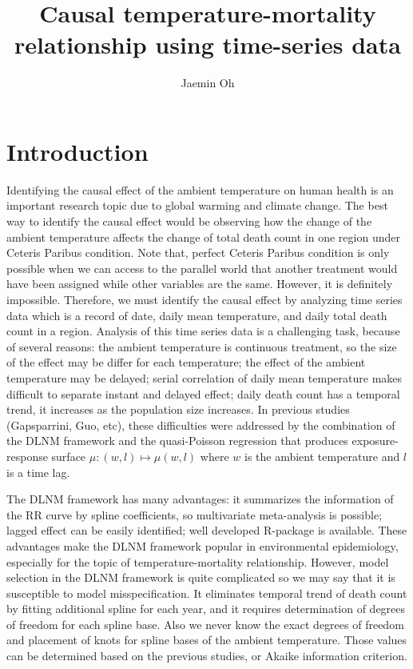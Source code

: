 \documentclass[12pt]{article}
\author[1]{Jaemin Oh}
\affil[1]{Department of Mathematical Sciences, KAIST}
\title{Causal temperature-mortality relationship using time-series data}
\begin{document}
\maketitle


\section{Introduction}

Identifying the causal effect of the ambient temperature on human health is 
an important research topic due to global warming and climate change.
The best way to identify the causal effect would be observing
how the change of the ambient temperature affects 
the change of total death count in one region under Ceteris Paribus condition.
Note that, perfect Ceteris Paribus condition is only possible
when we can access to the parallel world that 
another treatment would have been assigned while other variables are the same.
However, it is definitely impossible.
Therefore, we must identify the causal effect by analyzing time series data
which is a record of date, daily mean temperature, and daily total death count in a region.
Analysis of this time series data is a challenging task, because of several reasons:
the ambient temperature is continuous treatment, so the size of the effect may be differ for each temperature;
the effect of the ambient temperature may be delayed;
serial correlation of daily mean temperature makes difficult to separate instant and delayed effect;
daily death count has a temporal trend, it increases as the population size increases.
In previous studies (Gapsparrini, Guo, etc), these difficulties were addressed by 
the combination of the DLNM framework\cite{dlnm2010}
and the quasi-Poisson regression\cite{quasipoisson} that produces exposure-response surface
$\mu : (w, l) \mapsto \mu(w,l)$ where $w$ is the ambient temperature and $l$ is a time lag.

The DLNM framework has many advantages:
it summarizes the information of the RR curve by spline coefficients,
so multivariate meta-analysis is possible;
lagged effect can be easily identified;
well developed R-package is available\cite{dlnm2010R}.
These advantages make the DLNM framework popular in environmental epidemiology,
especially for the topic of temperature-mortality relationship.
However, model selection in the DLNM framework is quite complicated 
so we may say that it is susceptible to model misspecification\cite{gasparrini2016}.
It eliminates temporal trend of death count by fitting additional spline for each year,
and it requires determination of degrees of freedom for each spline base.
Also we never know the exact degrees of freedom 
and placement of knots for spline bases of the ambient temperature.
Those values can be determined based on the previous studies, 
or Akaike information criterion\cite{dlnm2010}.
\end{document}
